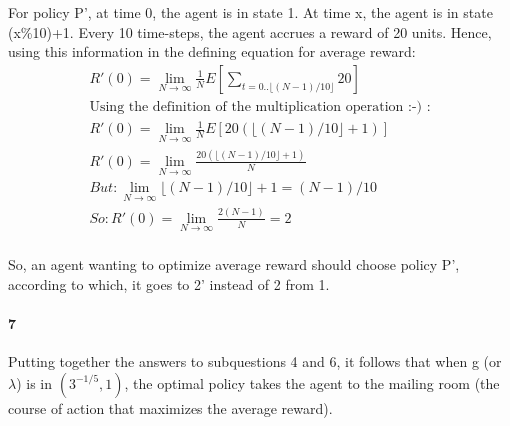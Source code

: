 \documentclass[10pt]{article}
\begin{document}
For policy P', at time 0, the agent is in state 1. At time x, the agent is in state (x\%10)+1. Every 10 time-steps, the agent accrues a reward of 20 units. Hence, using this information in the defining equation for average reward:
\begin{eqnarray}
R'(0)=\lim_{N\rightarrow \infty}\frac{1}{N}E[\sum_{t=0..\lfloor(N-1)/10\rfloor}20]\\
\text{Using the definition of the multiplication operation :-) :} \\
R'(0)=\lim_{N\rightarrow \infty}\frac{1}{N}E[20(\lfloor(N-1)/10\rfloor+1)]\\
R'(0)=\lim_{N\rightarrow \infty}\frac{20(\lfloor(N-1)/10\rfloor+1)}{N}\\
But: \lim_{N\rightarrow \infty}\lfloor(N-1)/10\rfloor+1=(N-1)/10\\
So: R'(0)=\lim_{N\rightarrow \infty}\frac{2(N-1)}{N}=2\\
\end{eqnarray}

So, an agent wanting to optimize average reward should choose policy P', according to which, it goes to 2' instead of 2 from 1.

\paragraph{7} Putting together the answers to subquestions 4 and 6, it follows that when g (or $\lambda$) is in $(3^{-1/5},1)$, the optimal policy takes the agent to the mailing room (the course of action that maximizes the average reward).
\end{document}
